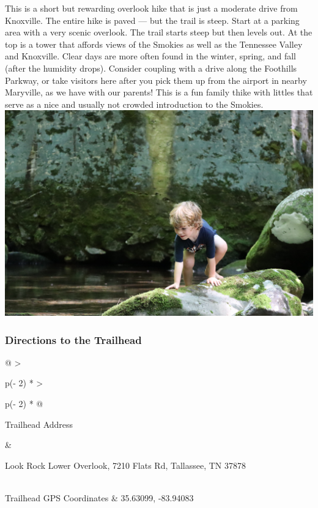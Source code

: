 \documentclass[
  letterpaper,
  DIV=11,
  numbers=noendperiod]{scrartcl}
\begin{document}
This is a short but rewarding overlook hike that is just a moderate
drive from Knoxville. The entire hike is paved --- but the trail is
steep. Start at a parking area with a very scenic overlook. The trail
starts steep but then levels out. At the top is a tower that affords
views of the Smokies as well as the Tennessee Valley and Knoxville.
Clear days are more often found in the winter, spring, and fall (after
the humidity drops). Consider coupling with a drive along the Foothills
Parkway, or take visitors here after you pick them up from the airport
in nearby Maryville, as we have with our parents! This is a fun family
thike with littles that serve as a nice and usually not crowded
introduction to the Smokies.
\includegraphics{img/trail-24-figure-01.jpg}

\hypertarget{directions-to-the-trailhead-25}{%
\subsubsection{Directions to the
Trailhead}\label{directions-to-the-trailhead-25}}

\begin{longtable}[]{@{}
  >{\raggedright\arraybackslash}p{(\columnwidth - 2\tabcolsep) * }
  >{\raggedright\arraybackslash}p{(\columnwidth - 2\tabcolsep) * }@{}}
\toprule\noalign{}
\begin{minipage}[b]{\linewidth}\raggedright
Trailhead Address
\end{minipage} & \begin{minipage}[b]{\linewidth}\raggedright
Look Rock Lower Overlook, 7210 Flats Rd, Tallassee, TN 37878
\end{minipage} \\
\midrule\noalign{}
\endhead
\bottomrule\noalign{}
\endlastfoot
Trailhead GPS Coordinates & 35.63099, -83.94083 \\
\end{longtable}
\end{document}
